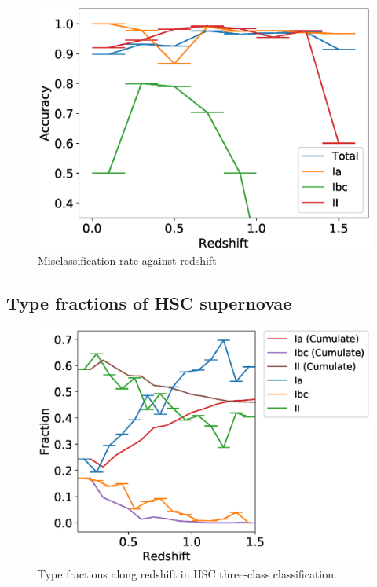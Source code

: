 \documentclass[useamsfonts]{pasj01}
\begin{document}
\begin{figure}[ht]
  \begin{center}
     \includegraphics[width=\columnwidth]{figures/misclass_rate_plastic_3class.eps}
  \end{center}
  \caption{%
  Misclassification rate against redshift
  }%
  \label{fig:misclass_rate_3class}
\end{figure}
%
\subsection{Type fractions of HSC supernovae}
%
\begin{figure}[ht]
  \begin{center}
     \includegraphics[width=\columnwidth]{figures/SNfrac_alongz.eps}
  \end{center}
  \caption{%
  Type fractions along redshift in HSC three-class classification.
  }%
  \label{fig:misclass_rate_3class}
\end{figure}
%
%
\end{document}
